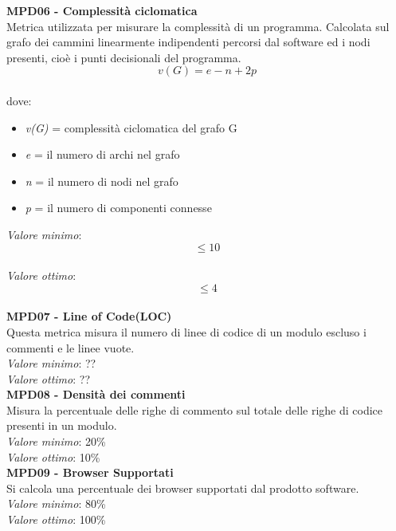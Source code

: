 \noindent\textbf{MPD06 - Complessità ciclomatica}\\
Metrica utilizzata per misurare la complessità di un programma. Calcolata sul grafo dei cammini linearmente indipendenti percorsi dal software ed i nodi presenti, cioè i punti decisionali del programma.\\
\begin{equation}
v(G) = e - n + 2p
\end{equation}\\
dove:
\begin{itemize}
	\item \textit{v(G)} = complessità ciclomatica del grafo G
	\item \textit{e} = il numero di archi nel grafo
	\item \textit{n} = il numero di nodi nel grafo
	\item \textit{p} = il numero di componenti connesse
\end{itemize}
\textit{Valore minimo}:$$ \leq 10 $$\\
\textit{Valore ottimo}:$$ \leq 4 $$\\

\noindent\textbf{MPD07 - Line of Code(LOC)}\\
Questa metrica misura il numero di linee di codice di un modulo escluso i commenti e le linee vuote.\\
\textit{Valore minimo}: ??\\
\textit{Valore ottimo}: ??\\

\noindent\textbf{MPD08 - Densità dei commenti}\\
Misura la percentuale delle righe di commento sul totale delle righe di codice presenti in un modulo.\\
\textit{Valore minimo}: 20\%\\
\textit{Valore ottimo}: 10\%\\

\noindent\textbf{MPD09 - Browser Supportati}\\
Si calcola una percentuale dei browser supportati dal prodotto software.\\	
\textit{Valore minimo}: 80\%\\
\textit{Valore ottimo}: 100\%\\
